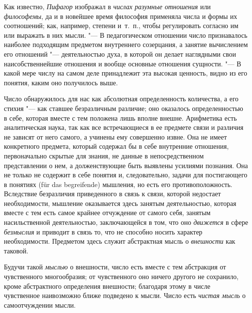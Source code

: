 Как известно, {\em Пифагор} изображал в
{\em числах разумные отношения} или
{\em философемы}, да и в новейшее время философия
применяла числа и формы их соотношений; как, например, степени и~т.~п.,
чтобы регулировать согласно им или выражать в них мысли. "--- В педагогическом
отношении число признавалось наиболее подходящим предметом внутреннего
созерцания, а занятие вычислением его отношений "--- деятельностью духа, в
которой он делает наглядными свои наисобственнейшие отношения и вообще
основные отношения сущности. "--- В какой мере числу на самом деле принадлежит
эта высокая ценность, видно из его понятия, каким оно получилось выше.

Число обнаружилось для нас как абсолютная определенность количества, а его
стихия "--- как ставшее безразличным различие; оно оказалось определенностью в
себе, которая вместе с тем положена лишь вполне внешне. Арифметика есть
аналитическая наука, так как все встречающиеся в ее предмете связи и
различия не зависят от него самого, а учинены ему совершенно извне. Она не
имеет конкретного предмета, который содержал бы в себе внутренние
отношения, первоначально скрытые для знания, не данные в непосредственном
представлении о нем, а долженствующие быть выявлены усилиями познания. Она
не только не содержит в себе понятия и, следовательно, задачи для
постигающего в понятиях (für das begreifende) мышления, но есть его
противоположность. Вследствие безразличия приведенного в связь к связи,
которой недостает необходимости, мышление оказывается здесь занятым
деятельностью, которая вместе с тем есть самое крайнее отчуждение от самого
себя, занятым насильственной деятельностью, заключающейся в том, что оно
{\em движется} в сфере
{\em безмыслия} и приводит в связь то, что не способно
носить характер необходимости. Предметом здесь служит абстрактная мысль о
{\em внешности} как таковой.

Будучи такой {\em мыслью} о внешности,
число есть вместе с тем абстракция от чувственного многообразия; от
чувственного оно ничего другого не сохранило, кроме абстрактного
определения внешности; благодаря этому в числе чувственное наивозможно
ближе подведено к мысли. Число есть {\em чистая мысль}
о самоотчуждении мысли.

